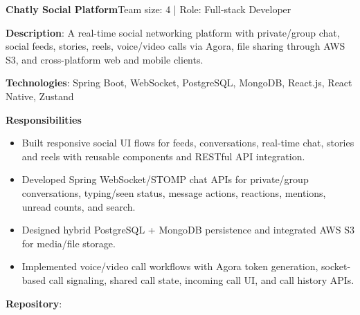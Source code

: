   \resumeProjectHeading
    {\textbf{Chatly Social Platform}}{Team size: 4 | Role: Full-stack Developer}
    \resumeItemListStart
      \item \textbf{Description}: A real-time social networking platform with private/group chat, social feeds, stories, reels,
        voice/video calls via Agora, file sharing through AWS S3, and cross-platform web and mobile clients.
      \item \textbf{Technologies}: Spring Boot, WebSocket, PostgreSQL, MongoDB, React.js, React Native, Zustand
      \item \textbf{Responsibilities}
        \begin{itemize}
          \item Built responsive social UI flows for feeds, conversations, real-time chat, stories and reels with reusable components and RESTful API integration.
          \item Developed Spring WebSocket/STOMP chat APIs for private/group conversations, typing/seen status, message actions, reactions, mentions, unread counts, and search.
          \item Designed hybrid PostgreSQL + MongoDB persistence and integrated AWS S3 for media/file storage.
          \item Implemented voice/video call workflows with Agora token generation, socket-based call signaling, shared call state, incoming call UI, and call history APIs.
        \end{itemize}
      \item \textbf{Repository}: \href{https://github.com/nvminh162/chatly-social-platform}{}
    \resumeItemListEnd

